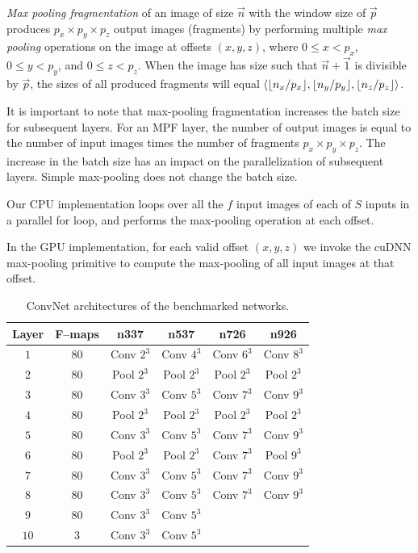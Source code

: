 \documentclass[conference]{./IEEEtran/IEEEtran}
\DeclarePairedDelimiter{\floor}{\lfloor}{\rfloor}
\DeclarePairedDelimiter{\angled}{\langle}{\rangle}
\begin{document}
  \emph{Max pooling fragmentation} of an image of size $\vec{n}$ with the
  window size of $\vec{p}$ produces $p_x \times p_y \times p_z$ output
  images (fragments) by performing multiple \emph{max pooling}
  operations on the image at offsets $(x,y,z)$, where $0 \le x < p_x$,
  $0 \le y < p_y$, and $0 \le z < p_z$.  When the image has size such
  that $\vec{n} + \vec{1}$ is divisible by $\vec{p}$, the sizes of all
  produced fragments will equal
  $\angled{\floor{n_x/p_x},\floor{n_y/p_y},\floor{n_z/p_z}}$.

  It is important to note that max-pooling fragmentation increases the
  batch size for subsequent layers.  For an MPF layer, the number of
  output images is equal to the number of input images times the
  number of fragments $p_x \times p_y \times p_z$.  The increase in
  the batch size has an impact on the parallelization of subsequent
  layers.  Simple max-pooling does not change the batch size.

  Our CPU implementation loops over all the $f$ input images of each
  of $S$ inputs in a parallel for loop, and performs the max-pooling
  operation at each offset.

  In the GPU implementation, for each valid offset $(x,y,z)$ we invoke
  the cuDNN max-pooling primitive to compute the max-pooling of all
  input images at that offset.

  \begin{table}
    {\footnotesize
    \centering
    \begin{tabular}{cccccc}
      \toprule
      Layer & F--maps & n337    & n537  &  n726  &  n926 \\
      \midrule
      $1$ & 80 &  Conv $2^3$  & Conv $4^3$  & Conv $6^3$  & Conv $8^3$ \\
      $2$ & 80 &  Pool $2^3$  & Pool $2^3$  & Pool $2^3$  & Pool $2^3$ \\
      $3$ & 80 &  Conv $3^3$  & Conv $5^3$  & Conv $7^3$  & Conv $9^3$ \\
      $4$ & 80 &  Pool $2^3$  & Pool $2^3$  & Pool $2^3$  & Pool $2^3$ \\
      $5$ & 80 &  Conv $3^3$  & Conv $5^3$  & Conv $7^3$  & Conv $9^3$ \\
      $6$ & 80 &  Pool $2^3$  & Pool $2^3$  & Conv $7^3$  & Pool $9^3$ \\
      $7$ & 80 &  Conv $3^3$  & Conv $5^3$  & Conv $7^3$  & Conv $9^3$ \\
      $8$ & 80 &  Conv $3^3$  & Conv $5^3$  & Conv $7^3$  & Conv $9^3$ \\
      $9$ & 80 & Conv $3^3$  & Conv $5^3$  & & \\
      $10$ & 3 & Conv $3^3$  & Conv $5^3$  & & \\
      \bottomrule
    \end{tabular}
    \caption{ConvNet architectures of the benchmarked networks.}
    \label{table:benchmarked_networks}
    }
  \end{table}
\end{document}
